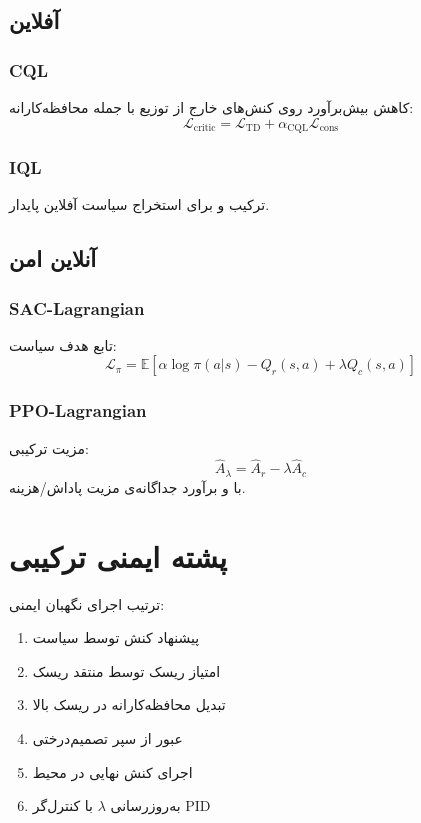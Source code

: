 \documentclass[conference]{IEEEtran}
\begin{document}
\subsection{آفلاین}
\subsubsection{CQL}
کاهش بیش‌برآورد روی کنش‌های خارج از توزیع با جمله محافظه‌کارانه:
\[
\mathcal{L}_{\text{critic}} = \mathcal{L}_{\text{TD}} + \alpha_{\text{CQL}}\mathcal{L}_{\text{cons}}
\]

\subsubsection{IQL}
ترکیب  و  برای استخراج سیاست آفلاین پایدار.

\subsection{آنلاین امن}
\subsubsection{SAC-Lagrangian}
تابع هدف سیاست:
\[
\mathcal{L}_{\pi} = \mathbb{E}[\alpha \log\pi(a|s) - Q_r(s,a) + \lambda Q_c(s,a)]
\]

\subsubsection{PPO-Lagrangian}
مزیت ترکیبی:
\[
\hat{A}_{\lambda} = \hat{A}_r - \lambda \hat{A}_c
\]
با  و برآورد جداگانه‌ی مزیت پاداش/هزینه.

\section{پشته ایمنی ترکیبی}
ترتیب اجرای نگهبان ایمنی:
\begin{enumerate}
  \item پیشنهاد کنش توسط سیاست
  \item امتیاز ریسک توسط منتقد ریسک
  \item تبدیل محافظه‌کارانه در ریسک بالا
  \item عبور از سپر تصمیم‌درختی
  \item اجرای کنش نهایی در محیط
  \item به‌روزرسانی \(\lambda\) با کنترل‌گر PID
\end{enumerate}
\end{document}
